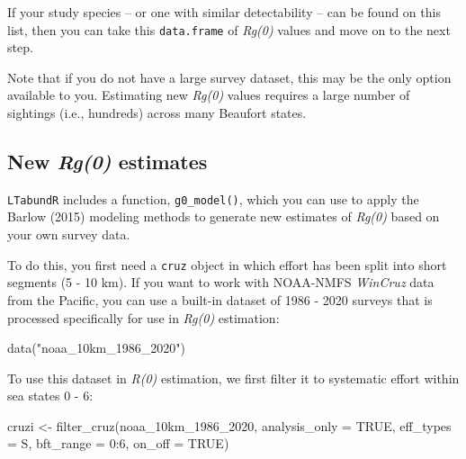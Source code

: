 \documentclass[
]{book}
\newenvironment{Shaded}{\begin{snugshade}}{\end{snugshade}}
\newcommand{\AttributeTok}[1]{\textcolor[rgb]{0.77,0.63,0.00}{#1}}
\newcommand{\ConstantTok}[1]{\textcolor[rgb]{0.00,0.00,0.00}{#1}}
\newcommand{\DecValTok}[1]{\textcolor[rgb]{0.00,0.00,0.81}{#1}}
\newcommand{\FunctionTok}[1]{\textcolor[rgb]{0.00,0.00,0.00}{#1}}
\newcommand{\NormalTok}[1]{#1}
\newcommand{\OtherTok}[1]{\textcolor[rgb]{0.56,0.35,0.01}{#1}}
\newcommand{\SpecialCharTok}[1]{\textcolor[rgb]{0.00,0.00,0.00}{#1}}
\newcommand{\StringTok}[1]{\textcolor[rgb]{0.31,0.60,0.02}{#1}}
\begin{document}
If your study species -- or one with similar detectability -- can be found on this list, then you can take this \texttt{data.frame} of \emph{Rg(0)} values and move on to the next step.

Note that if you do not have a large survey dataset, this may be the only option available to you. Estimating new \emph{Rg(0)} values requires a large number of sightings (i.e., hundreds) across many Beaufort states.

\hypertarget{new-rg0-estimates}{%
\subsection*{\texorpdfstring{New \emph{Rg(0)} estimates}{New Rg(0) estimates}}\label{new-rg0-estimates}}

\texttt{LTabundR} includes a function, \texttt{g0\_model()}, which you can use to apply the Barlow (2015) modeling methods to generate new estimates of \emph{Rg(0)} based on your own survey data.

To do this, you first need a \texttt{cruz} object in which effort has been split into short segments (5 - 10 km). If you want to work with NOAA-NMFS \emph{WinCruz} data from the Pacific, you can use a built-in dataset of 1986 - 2020 surveys that is processed specifically for use in \emph{Rg(0)} estimation:

\begin{Shaded}
\begin{Highlighting}[]
\FunctionTok{data}\NormalTok{(}\StringTok{"noaa\_10km\_1986\_2020"}\NormalTok{)}
\end{Highlighting}
\end{Shaded}

To use this dataset in \emph{R(0)} estimation, we first filter it to systematic effort within sea states 0 - 6:

\begin{Shaded}
\begin{Highlighting}[]
\NormalTok{cruzi }\OtherTok{\textless{}{-}} \FunctionTok{filter\_cruz}\NormalTok{(noaa\_10km\_1986\_2020,}
                     \AttributeTok{analysis\_only =} \ConstantTok{TRUE}\NormalTok{,}
                     \AttributeTok{eff\_types =} \StringTok{\textquotesingle{}S\textquotesingle{}}\NormalTok{,}
                     \AttributeTok{bft\_range =} \DecValTok{0}\SpecialCharTok{:}\DecValTok{6}\NormalTok{,}
                     \AttributeTok{on\_off =} \ConstantTok{TRUE}\NormalTok{)}
\end{Highlighting}
\end{Shaded}
\end{document}
